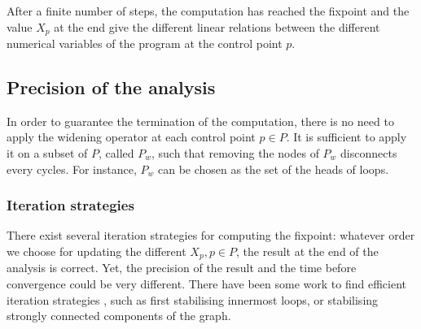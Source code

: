 \documentclass[a4paper,english,titlepage,11pt]{report}
\begin{document}
After a finite number of steps, the computation has reached the fixpoint and the
value $X_p$ at the end give the different linear relations between the
different numerical variables of the program at the control point $p$.

\subsection{Precision of the analysis}
In order to guarantee the termination of the computation, there is no need to
apply the widening operator at each control point $p \in P$. It is sufficient to
apply it on a subset of $P$, called $P_w$, such that removing the nodes of $P_w$
disconnects every cycles. For instance, $P_w$ can be chosen as the set of the
heads of loops.

\subsubsection{Iteration strategies}
There exist several iteration strategies for computing the fixpoint: whatever
order we choose for updating the different $X_p, p\in P$, the result at the
end of the analysis is correct. Yet, the precision of the result and the time
before convergence could be very different. 
There have been some work to find efficient iteration strategies
\cite{Bou92}, such as first stabilising innermost loops, or stabilising strongly
connected components of the graph.
\end{document}
